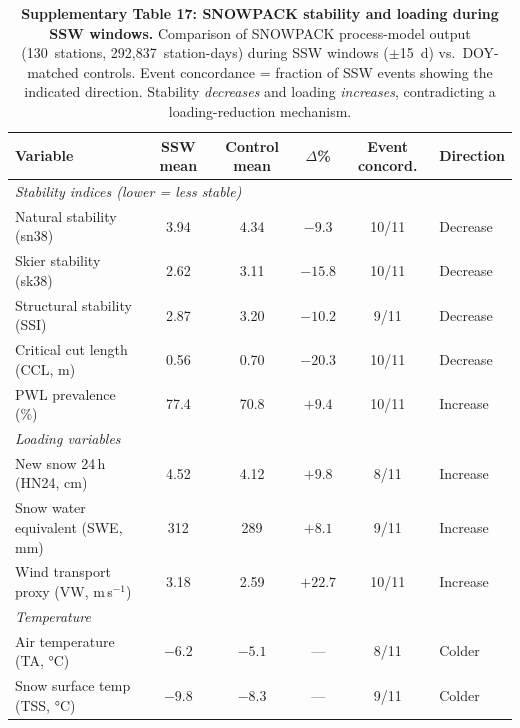 \documentclass[11pt,letterpaper]{article}
\begin{document}
\begin{table}[!ht]
\centering
\caption{\textbf{Supplementary Table 17: SNOWPACK stability and loading during SSW windows.}
Comparison of SNOWPACK process-model output (130~stations, 292,837~station-days) during SSW windows ($\pm$15~d) vs.\ DOY-matched controls. Event concordance = fraction of SSW events showing the indicated direction. Stability \emph{decreases} and loading \emph{increases}, contradicting a loading-reduction mechanism.}
\label{tab:snowpack}
\small
\begin{tabular}{lccccl}
\toprule
Variable & SSW mean & Control mean & $\Delta$\% & Event concord. & Direction \\
\midrule
\multicolumn{6}{l}{\textit{Stability indices (lower = less stable)}} \\
Natural stability (sn38) & 3.94 & 4.34 & $-9.3$ & 10/11 & Decrease \\
Skier stability (sk38) & 2.62 & 3.11 & $-15.8$ & 10/11 & Decrease \\
Structural stability (SSI) & 2.87 & 3.20 & $-10.2$ & 9/11 & Decrease \\
Critical cut length (CCL, m) & 0.56 & 0.70 & $-20.3$ & 10/11 & Decrease \\
PWL prevalence (\%) & 77.4 & 70.8 & $+9.4$ & 10/11 & Increase \\
\midrule
\multicolumn{6}{l}{\textit{Loading variables}} \\
New snow 24\,h (HN24, cm) & 4.52 & 4.12 & $+9.8$ & 8/11 & Increase \\
Snow water equivalent (SWE, mm) & 312 & 289 & $+8.1$ & 9/11 & Increase \\
Wind transport proxy (VW, m\,s$^{-1}$) & 3.18 & 2.59 & $+22.7$ & 10/11 & Increase \\
\midrule
\multicolumn{6}{l}{\textit{Temperature}} \\
Air temperature (TA, °C) & $-6.2$ & $-5.1$ & --- & 8/11 & Colder \\
Snow surface temp (TSS, °C) & $-9.8$ & $-8.3$ & --- & 9/11 & Colder \\
\bottomrule
\end{tabular}
\end{table}
\end{document}
